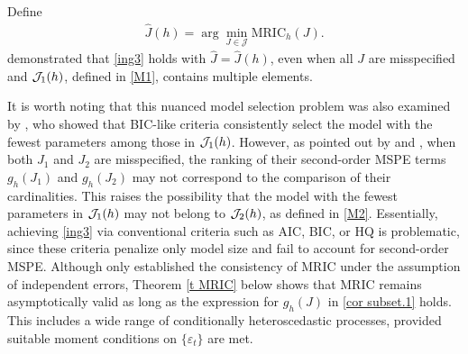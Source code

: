 \documentclass[ejsv2]{imsart}
\theoremstyle{plain}
\theoremstyle{definition}
\theoremstyle{remark}
\begin{document}
Define
\begin{eqnarray*}
\label{ing127}
\hat{J}(h)=\arg\min_{J\in\mathcal{J}}\textrm{MRIC}_{h}(J).
\end{eqnarray*}
\cite{Hsu2019}
demonstrated that
\eqref{ing3} holds with
$\hat{J}=\hat{J}(h)$,
even when all $J$ are misspecified and ${\cal J}_{1}(h)$, defined in \eqref{M1}, contains multiple elements.

It is worth noting that this nuanced model selection problem was also examined by
\cite{Kilian2006}, who showed that BIC-like criteria consistently select the model with the fewest parameters among those
in ${\cal J}_{1}(h)$.
However,
as pointed out by
\cite{Findley91} and
\cite{Hsu2019}, when both $J_1$ and $J_2$ are misspecified, 
the ranking of their second-order MSPE terms
$g_h(J_1)$ and $g_h(J_2)$ may not
correspond to the comparison of their cardinalities. 
This raises the possibility that
the model with the fewest parameters in ${\cal J}_{1}(h)$ may not belong to 
${\cal J}_{2}(h)$, 
as defined in \eqref{M2}. 
Essentially, achieving \eqref{ing3} via conventional criteria such as AIC, BIC, or HQ is problematic, since these criteria penalize only model size and fail to account for second-order MSPE. Although \cite{Hsu2019} only
established the consistency of MRIC under the assumption of independent errors, 
Theorem \ref{t MRIC} below
shows that MRIC remains asymptotically valid as long as the expression for
$g_{h}(J)$ in
\eqref{cor subset.1} holds.
 This includes a wide range of conditionally heteroscedastic processes, provided suitable moment conditions on
$\{\varepsilon_t\}$ are met.
\end{document}
